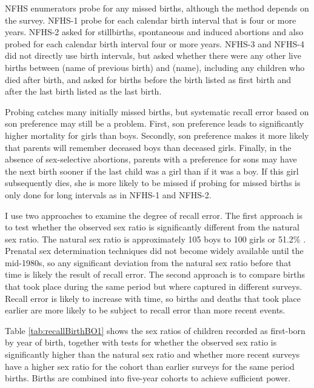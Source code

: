\documentclass[12pt,letterpaper]{article}
\begin{document}
NFHS enumerators probe for any missed births, although the method depends on the survey.
NFHS-1 probe for each calendar birth interval that is four or more years.
NFHS-2 asked for stillbirths, spontaneous and induced abortions and also probed 
for each calendar birth interval four or more years.
NFHS-3 and NFHS-4 did not directly use birth intervals, but asked whether there were any 
other live births between (name of previous birth) and (name), including any children who 
died after birth, and asked for births before the birth listed as first birth and
after the last birth listed as the last birth.

Probing catches many initially missed births, but systematic recall error based on son
preference may still be a problem.
First, son preference leads to significantly higher mortality for girls than boys.
Secondly, son preference makes it more likely that parents will remember deceased boys 
than deceased girls.
Finally, in the absence of sex-selective abortions, parents with a preference for sons may
have the next birth sooner if the last child was a girl than if it was a boy.
If this girl subsequently dies, she is more likely to be missed if probing for missed 
births is only done for long intervals as in NFHS-1 and NFHS-2.

I use two approaches to examine the degree of recall error.
The first approach is to test whether the observed sex ratio is significantly different
from the natural sex ratio.
The natural sex ratio is approximately 105 boys to 100 girls or
51.2\% \citep{ben-porath76b,jacobsen99,Portner2015b}.
Prenatal sex determination techniques did not become widely available until the mid-1980s, 
so any significant deviation from the natural sex ratio before that time is likely the 
result of recall error.
The second approach is to compare births that took place during the same period but
where captured in different surveys.
Recall error is likely to increase with time, so births and deaths that took place earlier 
are more likely to be subject to recall error than more recent events.

Table \ref{tab:recallBirthBO1} shows the sex ratios of children recorded as first-born by 
year of birth, together with tests for whether the observed sex ratio is significantly 
higher than the natural sex ratio and whether more recent surveys have a higher sex ratio 
for the cohort than earlier surveys for the same period births.
Births are combined into five-year cohorts to achieve sufficient power.


\end{document}
